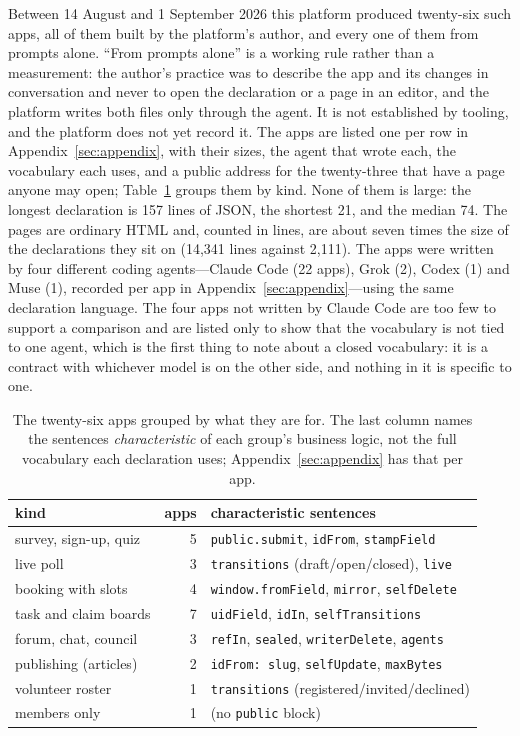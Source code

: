 \documentclass[11pt]{article}
\begin{document}
Between 14 August and 1 September 2026 this platform produced twenty-six such apps, all of them built by the platform's author, and every one of them from prompts alone. ``From prompts alone'' is a working rule rather than a measurement: the author's practice was to describe the app and its changes in conversation and never to open the declaration or a page in an editor, and the platform writes both files only through the agent. It is not established by tooling, and the platform does not yet record it. The apps are listed one per row in Appendix~\ref{sec:appendix}, with their sizes, the agent that wrote each, the vocabulary each uses, and a public address for the twenty-three that have a page anyone may open; Table~\ref{tab:apps} groups them by kind. None of them is large: the longest declaration is 157 lines of JSON, the shortest 21, and the median 74. The pages are ordinary HTML and, counted in lines, are about seven times the size of the declarations they sit on (14{,}341 lines against 2{,}111). The apps were written by four different coding agents---Claude Code (22 apps), Grok (2), Codex (1) and Muse (1), recorded per app in Appendix~\ref{sec:appendix}---using the same declaration language. The four apps not written by Claude Code are too few to support a comparison and are listed only to show that the vocabulary is not tied to one agent, which is the first thing to note about a closed vocabulary: it is a contract with whichever model is on the other side, and nothing in it is specific to one.

\begin{table}[tb]
\caption{The twenty-six apps grouped by what they are for. The last column names the sentences \emph{characteristic} of each group's business logic, not the full vocabulary each declaration uses; Appendix~\ref{sec:appendix} has that per app.}
\label{tab:apps}
\centering
\small
\begin{tabular}{@{}lrp{9cm}@{}}
\toprule
kind & apps & characteristic sentences \\
\midrule
survey, sign-up, quiz & 5 & \texttt{public.submit}, \texttt{idFrom}, \texttt{stampField} \\
live poll & 3 & \texttt{transitions} (draft/open/closed), \texttt{live} \\
booking with slots & 4 & \texttt{window.fromField}, \texttt{mirror}, \texttt{selfDelete} \\
task and claim boards & 7 & \texttt{uidField}, \texttt{idIn}, \texttt{selfTransitions} \\
forum, chat, council & 3 & \texttt{refIn}, \texttt{sealed}, \texttt{writerDelete}, \texttt{agents} \\
publishing (articles) & 2 & \texttt{idFrom: slug}, \texttt{selfUpdate}, \texttt{maxBytes} \\
volunteer roster & 1 & \texttt{transitions} (registered/invited/declined) \\
members only & 1 & (no \texttt{public} block) \\
\bottomrule
\end{tabular}
\end{table}
\end{document}

